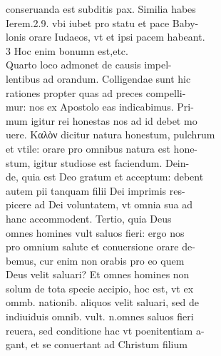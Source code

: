 \documentclass{article}
\begin{document}
\begin{pages}
                conseruanda est subditis pax. Similia habes \\
                Ierem.2.9. vbi iubet pro statu et pace Baby- \\
                lonis orare Iudaeos, vt et ipsi pacem habeant. \\
                3 Hoc enim bonumn est,etc. \\
                Quarto loco admonet de causis impel- \\
                lentibus ad orandum. Colligendae sunt hic \\
                rationes propter quas ad preces compelli- \\
                mur: nos ex Apostolo eas indicabimus. Pri- \\
                mum igitur rei honestas nos ad id debet mo \\
                uere. Καλὸν dicitur natura honestum, pulchrum \\
                et vtile: orare pro omnibus natura est hone- \\
                stum, igitur studiose est faciendum. Dein- \\
                de, quia est Deo gratum et acceptum: debent \\
                autem pii tanquam filii Dei imprimis res- \\
                picere ad Dei voluntatem, vt omnia sua ad \\
                hanc accommodent. Tertio, quia Deus \\
                omnes homines vult saluos fieri: ergo nos \\
                pro omnium salute et conuersione orare de- \\
                bemus, cur enim non orabis pro eo quem \\
                Deus velit saluari? Et omnes homines non \\
                solum de tota specie accipio, hoc est, vt ex \\
                ommb. nationib. aliquos velit saluari, sed de \\
                indiuiduis omnib. vult. n.omnes saluos fieri \\
                reuera, sed conditione hac vt poenitentiam a- \\
                gant, et se conuertant ad Christum filium \\

\end{pages}
\end{document}
